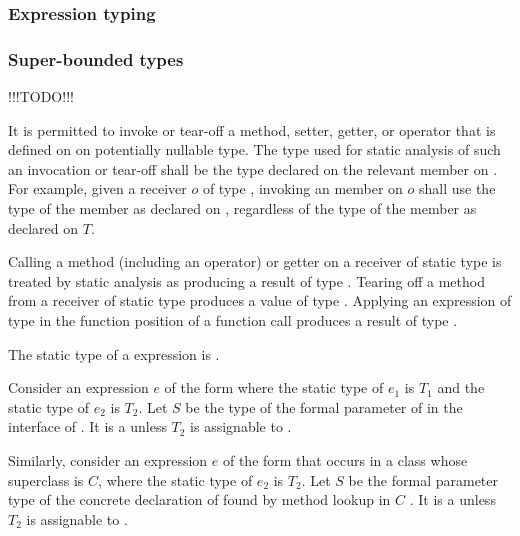 \documentclass[makeidx]{article}
\begin{document}
{\subsubsection{Expression typing}
\subsubsection{Super-bounded types}

!!!TODO!!!

It is permitted to invoke or tear-off a method, setter, getter, or operator that
is defined on  on potentially nullable type.  The type used for static
analysis of such an invocation or tear-off shall be the type declared on the
relevant member on .  For example, given a receiver $o$ of type ,
invoking an  member on $o$ shall use the type of the member as declared
on , regardless of the type of the member as declared on $T$.



Calling a method (including an operator) or getter on a receiver of static type
 is treated by static analysis as producing a result of type .
Tearing off a method from a receiver of static type  produces a value of
type .  Applying an expression of type  in the function position
of a function call produces a result of type .

The static type of a  expression is .

Consider an expression $e$ of the form  where the static type of
$e_1$ is $T_1$ and the static type of $e_2$ is $T_2$. Let $S$ be the type of the
formal parameter of  in the interface of .
It is a  unless $T_2$ is assignable to .

Similarly, consider an expression $e$ of the form  that occurs in a
class whose superclass is $C$, where the static type of $e_2$ is $T_2$. Let $S$ be
the formal parameter type of the concrete declaration of  found by
method lookup in $C$
.
It is a  unless $T_2$ is assignable to .

}
\end{document}
